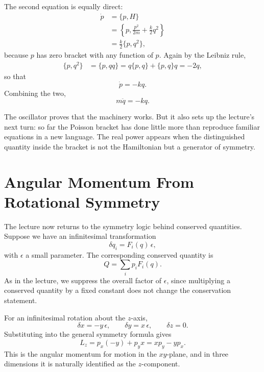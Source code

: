 The second equation is equally direct:
\begin{align}
\dot p
&=\{p,H\}\\
&=\left\{p,\frac{p^2}{2m}+\frac{k}{2}q^2\right\}\\
&=\frac{k}{2}\{p,q^2\},
\end{align}
because \(p\) has zero bracket with any function of \(p\). Again by the Leibniz rule,
\begin{align}
\{p,q^2\}&=\{p,qq\}=q\{p,q\}+\{p,q\}q=-2q,
\end{align}
so that
\begin{equation}
\dot p=-kq.
\end{equation}
Combining the two,
\begin{equation}
m\ddot q=-kq.
\end{equation}

The oscillator proves that the machinery works. But it also sets up the lecture's next turn: so far the Poisson bracket has done little more than reproduce familiar equations in a new language. The real power appears when the distinguished quantity inside the bracket is not the Hamiltonian but a generator of symmetry.

\section{Angular Momentum From Rotational Symmetry}

The lecture now returns to the symmetry logic behind conserved quantities. Suppose we have an infinitesimal transformation
\begin{equation}
\delta q_i=F_i(q)\,\epsilon,
\end{equation}
with \(\epsilon\) a small parameter. The corresponding conserved quantity is
\begin{equation}
Q=\sum_i p_i F_i(q).
\end{equation}
As in the lecture, we suppress the overall factor of \(\epsilon\), since multiplying a conserved quantity by a fixed constant does not change the conservation statement.

For an infinitesimal rotation about the \(z\)-axis,
\begin{equation}
\delta x=-y\,\epsilon,\qquad \delta y=x\,\epsilon,\qquad \delta z=0.
\end{equation}
Substituting into the general symmetry formula gives
\begin{equation}
L_z=p_x(-y)+p_yx=xp_y-yp_x.
\end{equation}
This is the angular momentum for motion in the \(xy\)-plane, and in three dimensions it is naturally identified as the \(z\)-component.

